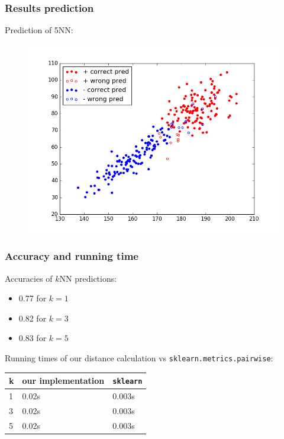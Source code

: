 \documentclass{beamer}
\begin{document}
\begin{frame}
\frametitle{Results prediction}
Prediction of 5NN:
\begin{figure}
	\includegraphics[height=0.8\textheight]{graphics/5NNPrediction}
\end{figure}
\end{frame} 


\begin{frame}
\frametitle{Accuracy and running time}
Accuracies of $k$NN predictions:
	\begin{itemize}
		\item 0.77 for $k=1$
		\item 0.82 for $k=3$
		\item 0.83 for $k=5$
	\end{itemize}

Running times of our distance calculation vs \texttt{sklearn.metrics.pairwise}:
\begin{table}[]
	\centering
	\label{my-label}
	\begin{tabular}{l|l|l}
		k & our implementation &  \texttt{sklearn}\\ \hline
		1    & 0.02s & 0.003s \\ \hline
		3    & 0.02s & 0.003s \\ \hline
		5    & 0.02s & 0.003s \\ 
	\end{tabular}
\end{table}

\end{frame}
\end{document}
